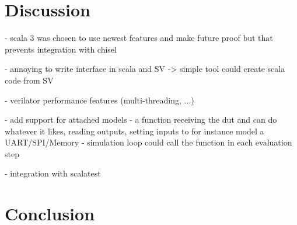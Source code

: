 \documentclass[12pt]{report}
\begin{document}
\chapter{Discussion} %

- scala 3 was chosen to use newest features and make future proof but that prevents integration with chisel

- annoying to write interface in scala and SV -> simple tool could create scala code from SV


- verilator performance features (multi-threading, ...)

- add support for attached models
- a function receiving the dut and can do whatever it likes, reading outputs, setting inputs to for instance model a
UART/SPI/Memory
- simulation loop could call the function in each evaluation step

- integration with scalatest

\chapter{Conclusion} %

\printbibliography
\end{document}
